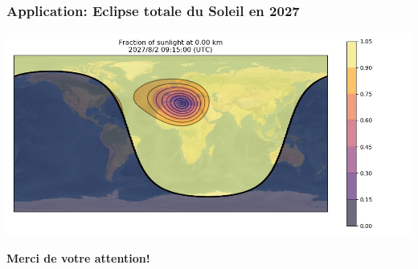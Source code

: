 \documentclass{beamer}
\begin{document}
\begin{frame}
\frametitle{Application: Eclipse totale du Soleil en 2027}

\vspace{6mm}

\centerline{\includegraphics[width=1.1\linewidth]{figs/eclipse-4659.jpg}}

\vspace{6mm}
\end{frame}

\begin{frame}

\textbf{Merci de votre attention!}
\end{frame}
\end{document}
